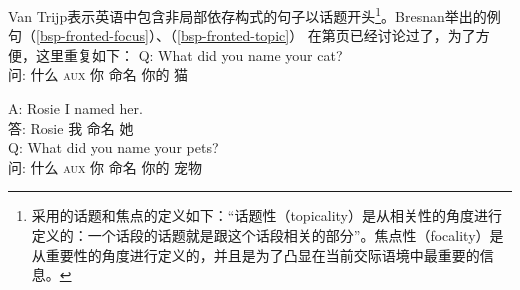 Van Trijp表示英语中包含非局部依存构式的句子以话题开头\footnote{%
采用的话题和焦点的定义如下：“话题性（topicality）是从相关性的角度进行定义的：一个话段的话题就是跟这个话段相关的部分”。焦点性（focality）是从重要性的角度进行定义的，并且是为了凸显在当前交际语境中最重要的信息。
}。Bresnan举出的例句（\ref{bsp-fronted-focus}）、（\ref{bsp-fronted-topic}） 在第\pageref{bsp-fronted-focus}页\citep[]{Bresnan2001a}已经讨论过了，为了方便，这里重复如下：
\ea
\label{bsp-fronted-focus-two}
\gll Q: What did you name your cat?\\  
     问: 什么 \textsc{aux} 你 命名 你的 猫\\

\gll A: Rosie I named her. \\
     答: Rosie 我 命名 她\\
\z
\ea
\label{bsp-fronted-topic-two}
\gll Q: What did you name your pets?\\    
     问: 什么 \textsc{aux} 你 命名 你的 宠物\\

